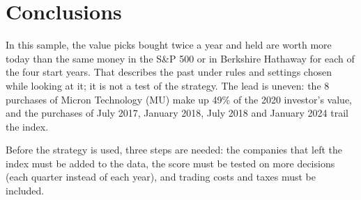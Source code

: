 \documentclass[11pt,a4paper]{article}
\begin{document}
\section{Conclusions}
In this sample, the value picks bought twice a year and held are worth more today than the same money in the S\&P 500 or in Berkshire Hathaway for each of the four start years. That describes the past under rules and settings chosen while looking at it; it is not a test of the strategy. The lead is uneven: the 8 purchases of Micron Technology (MU) make up 49\% of the 2020 investor's value, and the purchases of July 2017, January 2018, July 2018 and January 2024 trail the index.

Before the strategy is used, three steps are needed: the companies that left the index must be added to the data, the score must be tested on more decisions (each quarter instead of each year), and trading costs and taxes must be included.

\newpage
\appendix
\end{document}
